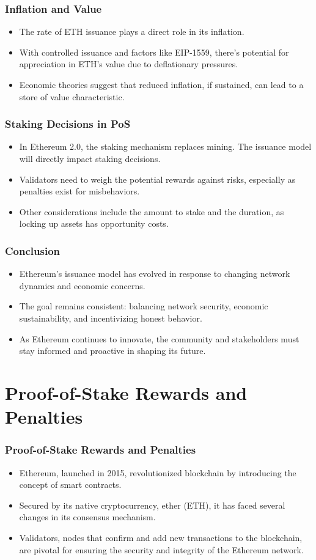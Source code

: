 \documentclass{beamer}
\begin{document}
\begin{frame}
\frametitle{Inflation and Value}
\begin{itemize}
    \item The rate of ETH issuance plays a direct role in its inflation.
    \item With controlled issuance and factors like EIP-1559, there's potential for appreciation in ETH's value due to deflationary pressures.
    \item Economic theories suggest that reduced inflation, if sustained, can lead to a store of value characteristic.
\end{itemize}
\end{frame}


\begin{frame}
\frametitle{Staking Decisions in PoS}
\begin{itemize}
    \item In Ethereum 2.0, the staking mechanism replaces mining. The issuance model will directly impact staking decisions.
    \item Validators need to weigh the potential rewards against risks, especially as penalties exist for misbehaviors.
    \item Other considerations include the amount to stake and the duration, as locking up assets has opportunity costs.
\end{itemize}
\end{frame}

\begin{frame}
\frametitle{Conclusion}
\begin{itemize}
    \item Ethereum's issuance model has evolved in response to changing network dynamics and economic concerns.
    \item The goal remains consistent: balancing network security, economic sustainability, and incentivizing honest behavior.
    \item As Ethereum continues to innovate, the community and stakeholders must stay informed and proactive in shaping its future.
\end{itemize}
\end{frame}
\section{Proof-of-Stake Rewards and Penalties}
\begin{frame}
    \frametitle{Proof-of-Stake Rewards and Penalties}
    \begin{itemize}
        \item Ethereum, launched in 2015, revolutionized blockchain by introducing the concept of smart contracts.
        \item Secured by its native cryptocurrency, ether (ETH), it has faced several changes in its consensus mechanism.
        \item Validators, nodes that confirm and add new transactions to the blockchain, are pivotal for ensuring the security and integrity of the Ethereum network.
    \end{itemize}
\end{frame}
\end{document}
